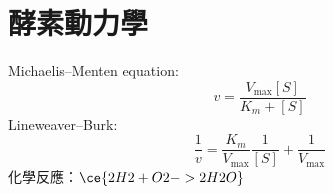 \section*{酵素動力學}
Michaelis--Menten equation:
\[
v=\frac{V_{\max}[S]}{K_m+[S]}
\]
Lineweaver--Burk:
$$
\frac{1}{v}=\frac{K_m}{V_{\max}}\frac{1}{[S]}+\frac{1}{V_{\max}}
$$
化學反應：$\ce{2H2 + O2 -> 2H2O}$

